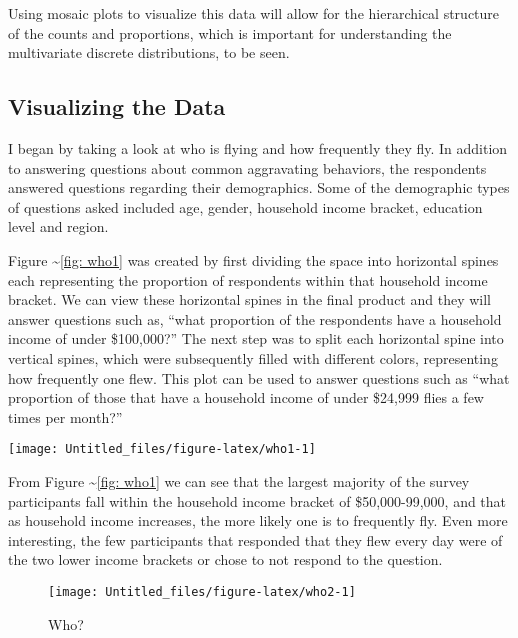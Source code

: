 Using mosaic plots to visualize this data will allow for the
hierarchical structure of the counts and proportions, which is important
for understanding the multivariate discrete distributions, to be seen.

\subsection{Visualizing the Data}\label{visualizing-the-data}

I began by taking a look at who is flying and how frequently they fly.
In addition to answering questions about common aggravating behaviors,
the respondents answered questions regarding their demographics. Some of
the demographic types of questions asked included age, gender, household
income bracket, education level and region.

Figure \textasciitilde{}\ref{fig: who1} was created by first dividing
the space into horizontal spines each representing the proportion of
respondents within that household income bracket. We can view these
horizontal spines in the final product and they will answer questions
such as, ``what proportion of the respondents have a household income of
under \$100,000?'' The next step was to split each horizontal spine into
vertical spines, which were subsequently filled with different colors,
representing how frequently one flew. This plot can be used to answer
questions such as ``what proportion of those that have a household
income of under \$24,999 flies a few times per month?''

\begin{Schunk}

\texttt{[image: Untitled\_files/figure-latex/who1-1]} \end{Schunk}

From Figure \textasciitilde{}\ref{fig: who1} we can see that the largest
majority of the survey participants fall within the household income
bracket of \$50,000-99,000, and that as household income increases, the
more likely one is to frequently fly. Even more interesting, the few
participants that responded that they flew every day were of the two
lower income brackets or chose to not respond to the question.

\begin{Schunk}
\begin{figure}
\texttt{[image: Untitled\_files/figure-latex/who2-1]} \caption[Who?]{Who?}\label{fig:who2}
\end{figure}
\end{Schunk}

